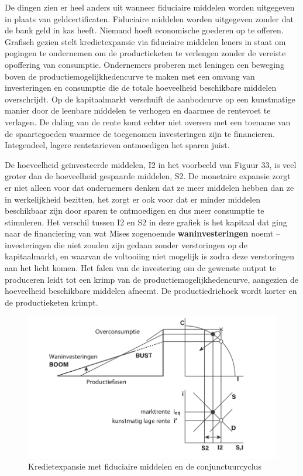 De dingen zien er heel anders uit wanneer fiduciaire middelen worden uitgegeven in plaats van geldcertificaten. Fiduciaire middelen worden uitgegeven zonder dat de bank geld in kas heeft. Niemand hoeft economische goederen op te offeren. Grafisch gezien stelt kredietexpansie via fiduciaire middelen leners in staat om pogingen te ondernemen om de productieketen te verlengen zonder de vereiste opoffering van consumptie. Ondernemers proberen met leningen een beweging boven de productiemogelijkhedencurve te maken met een omvang van investeringen en consumptie die de totale hoeveelheid beschikbare middelen overschrijdt. Op de kapitaalmarkt verschuift de aanbodcurve op een kunstmatige manier door de leenbare middelen te verhogen en daarmee de rentevoet te verlagen. De daling van de rente komt echter niet overeen met een toename van de spaartegoeden waarmee de toegenomen investeringen zijn te financieren. Integendeel, lagere rentetarieven ontmoedigen het sparen juist.

De hoeveelheid geïnvesteerde middelen, I2 in het voorbeeld van Figuur 33, is veel groter dan de hoeveelheid gespaarde middelen, S2. De monetaire expansie zorgt er niet alleen voor dat ondernemers denken dat ze meer middelen hebben dan ze in werkelijkheid bezitten, het zorgt er ook voor dat er minder middelen beschikbaar zijn door sparen te ontmoedigen en dus meer consumptie te stimuleren. Het verschil tussen I2 en S2 in deze grafiek is het kapitaal dat ging naar de financiering van wat Mises zogenoemde \textbf{waninvesteringen} noemt -- investeringen die niet zouden zijn gedaan zonder verstoringen op de kapitaalmarkt, en waarvan de voltooiing niet mogelijk is zodra deze verstoringen aan het licht komen.\autocite{177} Het falen van de investering om de gewenste output te produceren leidt tot een krimp van de productiemogelijkhedencurve, aangezien de hoeveelheid beschikbare middelen afneemt. De productiedriehoek wordt korter en de productieketen krimpt.

\begin{figure}
\centering
    \includegraphics[width=\textwidth]{figures/fig33-1.png}
    \caption[Kredietexpansie met fiduciaire middelen en de conjunctuurcyclus]{Kredietexpansie met fiduciaire middelen en de conjunctuurcyclus}
    \label{fig33}
\end{figure}

